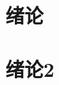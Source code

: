 \documentclass[lang=chs, degree=phd, blindreview=false, winfonts=true]{yanputhesis}
\begin{document}
\tableofcontents
\chapter{绪论}
\chapter{绪论2}
\end{document}
